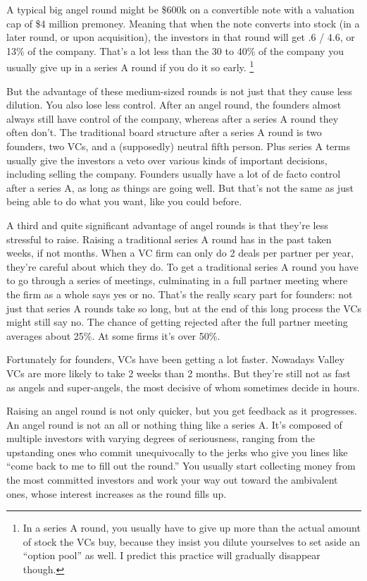 \documentclass[12pt]{book}
\begin{document}
A typical big angel round might be \$600k on a convertible note with a
valuation cap of \$4 million premoney. Meaning that when the note
converts into stock (in a later round, or upon acquisition), the
investors in that round will get .6 / 4.6, or 13\% of the company.
That's a lot less than the 30 to 40\% of the company you usually give up
in a series A round if you do it so early. \footnote{In a series A round, you usually have to give up more than the
actual amount of stock the VCs buy, because they insist you dilute
yourselves to set aside an ``option pool'' as well. I predict this
practice will gradually disappear though.}

But the advantage of these medium-sized rounds is not just that they
cause less dilution. You also lose less control. After an angel round,
the founders almost always still have control of the company, whereas
after a series A round they often don't. The traditional board structure
after a series A round is two founders, two VCs, and a (supposedly)
neutral fifth person. Plus series A terms usually give the investors a
veto over various kinds of important decisions, including selling the
company. Founders usually have a lot of de facto control after a series
A, as long as things are going well. But that's not the same as just
being able to do what you want, like you could before.

A third and quite significant advantage of angel rounds is that they're
less stressful to raise. Raising a traditional series A round has in the
past taken weeks, if not months. When a VC firm can only do 2 deals per
partner per year, they're careful about which they do. To get a
traditional series A round you have to go through a series of meetings,
culminating in a full partner meeting where the firm as a whole says yes
or no. That's the really scary part for founders: not just that series A
rounds take so long, but at the end of this long process the VCs might
still say no. The chance of getting rejected after the full partner
meeting averages about 25\%. At some firms it's over 50\%.

Fortunately for founders, VCs have been getting a lot faster. Nowadays
Valley VCs are more likely to take 2 weeks than 2 months. But they're
still not as fast as angels and super-angels, the most decisive of whom
sometimes decide in hours.

Raising an angel round is not only quicker, but you get feedback as it
progresses. An angel round is not an all or nothing thing like a series
A. It's composed of multiple investors with varying degrees of
seriousness, ranging from the upstanding ones who commit unequivocally
to the jerks who give you lines like ``come back to me to fill out the
round.'' You usually start collecting money from the most committed
investors and work your way out toward the ambivalent ones, whose
interest increases as the round fills up.
\end{document}
